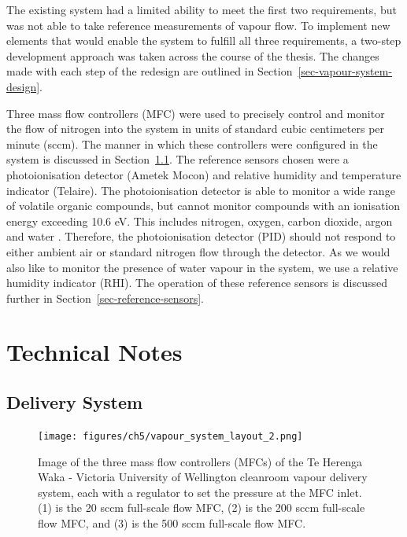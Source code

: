 \documentclass[
  a4paper,
]{scrbook}
\begin{document}
The existing system had a limited ability to meet the first two
requirements, but was not able to take reference measurements of vapour
flow. To implement new elements that would enable the system to fulfill
all three requirements, a two-step development approach was taken across
the course of the thesis. The changes made with each step of the
redesign are outlined in Section~\ref{sec-vapour-system-design}.

Three mass flow controllers (MFC) were used to precisely control and
monitor the flow of nitrogen into the system in units of standard cubic
centimeters per minute (sccm). The manner in which these controllers
were configured in the system is discussed in
Section~\ref{sec-delivery-system}. The reference sensors chosen were a
photoionisation detector (Ametek Mocon) and relative humidity and
temperature indicator (Telaire). The photoionisation detector is able to
monitor a wide range of volatile organic compounds, but cannot monitor
compounds with an ionisation energy exceeding 10.6 eV. This includes
nitrogen, oxygen, carbon dioxide, argon and water
\autocite{PIDmanual,Ionscience}. Therefore, the photoionisation detector
(PID) should not respond to either ambient air or standard nitrogen flow
through the detector. As we would also like to monitor the presence of
water vapour in the system, we use a relative humidity indicator (RHI).
The operation of these reference sensors is discussed further in
Section~\ref{sec-reference-sensors}.

\hypertarget{technical-notes}{%
\section{Technical Notes}\label{technical-notes}}

\hypertarget{sec-delivery-system}{%
\subsection{Delivery System}\label{sec-delivery-system}}

\begin{figure}

{\centering \texttt{[image: figures/ch5/vapour\_system\_layout\_2.png]}

}

\caption{\label{fig-mass-flow-controller-layout}Image of the three mass
flow controllers (MFCs) of the Te Herenga Waka - Victoria University of
Wellington cleanroom vapour delivery system, each with a regulator to
set the pressure at the MFC inlet. (1) is the 20 sccm full-scale flow
MFC, (2) is the 200 sccm full-scale flow MFC, and (3) is the 500 sccm
full-scale flow MFC.}

\end{figure}
\end{document}

